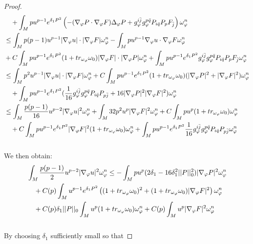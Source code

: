 \documentclass[11pt]{amsart}
\numberwithin{equation}{section}
\begin{document}
\begin{proof}
\begin{align}
	&\quad + \int_M pu^{p-1}e^{\delta_1P^2}\left(-(\nabla_\varphi P\cdot \nabla_\varphi F)\Delta_\varphi P+ g_\varphi^{i\bar j}g_\varphi^{p\bar q}P_{i\bar q}P_{p}F_{\bar j} \right)  \omega_{\varphi}^{n} \notag\\
	&\le \int_M p(p-1)u^{p-1}|\nabla_\varphi u|\cdot|\nabla_\varphi F| \omega_\varphi^n -\int_M pu^{p-1}\nabla_{\varphi}u\cdot \nabla_{\varphi}F\omega_{\varphi}^n \notag\\
	& +C \int_M pu^{p-1}e^{\delta_1P^2}(1+tr_{\omega_{\varphi}}\omega_0) |\nabla_{\varphi}F|\cdot |\nabla_{\varphi}P| \omega_\varphi^n + \int_M pu^{p-1}e^{\delta_1P^2}g_\varphi^{i\bar j}g_\varphi^{p\bar q}P_{i\bar q}P_{p}F_{\bar j}   \omega_{\varphi}^{n} \notag\\
	&\le \int_M p^2u^{p-1}|\nabla_\varphi u|\cdot|\nabla_\varphi F| \omega_\varphi^n + C\int_M pu^{p-1}e^{\delta_1P^2}(1+tr_{\omega_{\varphi}}\omega_0)(|\nabla_\varphi P|^2+|\nabla_\varphi F|^2)\omega_\varphi^n \notag\\
	&\quad + \int_M pu^{p-1}e^{\delta_1P^2}(\frac{1}{16}g_\varphi^{i\bar j}g_\varphi^{p\bar q}P_{i\bar q}P_{p\bar j}+16 |\nabla_\varphi P|^2|\nabla_\varphi F|^2)\omega_\varphi^n \notag \\
	&\le \int_M\frac{p(p-1)}{16}u^{p-2}|\nabla_{\varphi}u|^2\omega_{\varphi}^n+\int_M 32p^2 u^p|\nabla_{\varphi}F|^2\omega_{\varphi}^n + C\int_M pu^{p}(1+tr_{\omega_{\varphi}}\omega_0)\omega_\varphi^n \notag\\
	&\quad +C\int_M pu^{p-1}e^{\delta_1P^2}|\nabla_\varphi F|^2 (1+tr_{\omega_{\varphi}}\omega_0) \omega_\varphi^n + \int_M pu^{p-1}e^{\delta_1P^2}\frac{1}{16}g_\varphi^{i\bar j}g_\varphi^{p\bar q}P_{i\bar q}P_{p\bar j} \omega_\varphi^n
\end{align}\\
We then obtain:
\begin{align}
	&\int_M \frac{p(p-1)}{2} u^{p-2}|\nabla_{\varphi}u|^2\omega_{\varphi}^n \le -\int_M pu^p(2\delta_1-16\delta_1^2||P||_0^2)|\nabla_{\varphi}P|^2 \omega_{\varphi}^n \notag\\
	&\quad +C(p) \int_M u^{p-1}e^{\delta_1P^2} \left((1+tr_{\omega_{\varphi}}\omega_0)^2 + (1+tr_{\omega_{\varphi}}\omega_0)|\nabla_\varphi F|^2\right) \omega_\varphi^n \notag\\
	&\quad + C(p)\delta_1||P||_0 \int_M u^p (1+tr_{\omega_{\varphi}}\omega_0)\omega_\varphi^n +C(p)\int_M u^p |\nabla_\varphi F|^2\omega_\varphi^n  
\end{align}\\
By choosing $\delta_1$ sufficiently small so that 

\end{proof}
\end{document}
